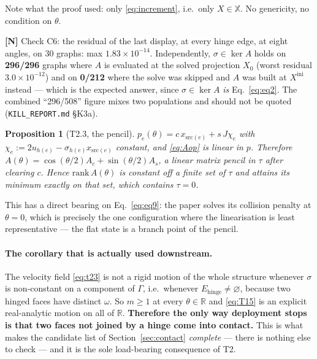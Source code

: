 \documentclass[11pt,a4paper]{article}
\newtheorem{proposition}[theorem]{Proposition}
\theoremstyle{definition}
\newcommand{\Ehinge}{E_{\mathrm{hinge}}}
\newcommand{\file}[1]{\texttt{\small #1}}
\begin{document}
\noindent Note what the proof used: only \eqref{eq:increment}, i.e.\ only $X\in\mathbb{X}$.
No genericity, no condition on $\theta$.

\textbf{[N]} Check C6: the residual of the last display, at every hinge edge, at eight
angles, on 30 graphs: max $1.83\times10^{-14}$. Independently,
$\sigma\in\ker A$ holds on \textbf{296/296} graphs where $A$ is evaluated at the solved
projection $X_0$ (worst residual $3.0\times10^{-12}$) and on \textbf{0/212} where the solve
was skipped and $A$ was built at $X^{\mathrm{ini}}$ instead --- which is the expected answer,
since $\sigma\in\ker A$ \emph{is} Eq.~\eqref{eq:eq2}. The combined ``296/508'' figure mixes
two populations and should not be quoted (\file{KILL\_REPORT.md} §K3a).

\begin{proposition}[T2.3, the pencil]
$p_e(\theta)=c\,x_{\mathrm{src}(e)}+s\,J\chi_e$ with
$\chi_e:=2u_{h(e)}-\sigma_{h(e)}x_{\mathrm{src}(e)}$ constant, and \eqref{eq:Aop} is linear
in $p$. Therefore $A(\theta)=\cos(\theta/2)A_c+\sin(\theta/2)A_s$, a linear matrix pencil in
$\tau$ after clearing $c$. Hence $\mathrm{rank}\,A(\theta)$ is constant off a finite set of
$\tau$ and attains its \emph{minimum} exactly on that set, which contains $\tau=0$.
\end{proposition}

\noindent This has a direct bearing on Eq.~\eqref{eq:eq9}: the paper solves its collision
penalty at $\theta=0$, which is precisely the one configuration where the linearisation is
least representative --- the flat state is a branch point of the pencil.

\paragraph{The corollary that is actually used downstream.} The velocity field
\eqref{eq:t23} is not a rigid motion of the whole structure whenever $\sigma$ is non-constant
on a component of $\Gamma$, i.e.\ whenever $\Ehinge\ne\varnothing$, because two hinged faces
have distinct $\omega$. So $m\ge1$ at every $\theta\in\mathbb{R}$ and \eqref{eq:T15} is an
explicit real-analytic motion on all of $\mathbb{R}$. \textbf{Therefore the only way
deployment stops is that two faces not joined by a hinge come into contact.} This is what
makes the candidate list of Section~\ref{sec:contact} \emph{complete} --- there is nothing
else to check --- and it is the sole load-bearing consequence of T2.
\end{document}
